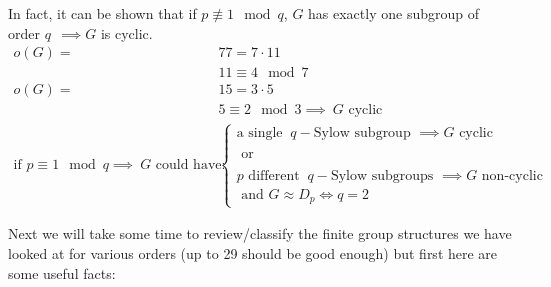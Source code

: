 \begin{enumerate}[label=(\arabic*.)]
\noindent In fact, it can be shown that if $p\not \equiv 1 \mod q$, $G$ has exactly one subgroup of
order $q\ \ \implies G$ is cyclic.
\begin{align}
    o(G)=&77=7\cdot 11 \nonumber \\
    &11\equiv 4 \mod 7 \nonumber \\
    o(G)=&15= 3\cdot 5 \nonumber \\
    &5\equiv 2 \mod 3 \implies \ G \text{ cyclic} \nonumber \\
    \text{if }p \equiv 1 \mod q \implies \ G \text{ could have: }&\begin{cases}
      \text{a single } \ q-\text{Sylow subgroup } \implies G \text{ cyclic }\\
      \\
      \text{ or } \\
      \\
      p \text{ different } \ q-\text{Sylow subgroups } \implies G \text{ non-cyclic}\\
      \text{ and } G\approx D_p \iff q=2
    \end{cases} \nonumber
\end{align}
\end{enumerate}
Next we will take some time to review/classify the finite group structures we have looked at for
various orders (up to 29 should be good enough) but first here are some useful facts:\\

